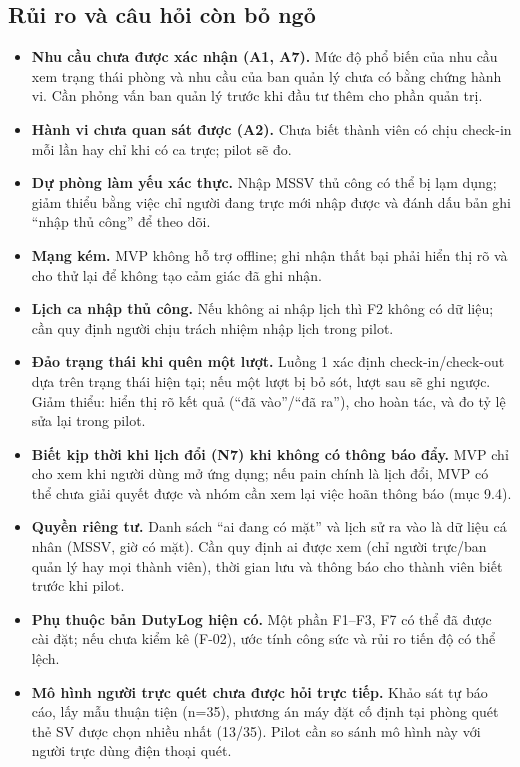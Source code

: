 \subsection{Rủi ro và câu hỏi còn bỏ ngỏ}
\begin{itemize}[nosep]
\item \textbf{Nhu cầu chưa được xác nhận (A1, A7).} Mức độ phổ biến của nhu cầu xem trạng thái phòng và nhu cầu của ban quản lý chưa có bằng chứng hành vi. Cần phỏng vấn ban quản lý trước khi đầu tư thêm cho phần quản trị.
\item \textbf{Hành vi chưa quan sát được (A2).} Chưa biết thành viên có chịu check-in mỗi lần hay chỉ khi có ca trực; pilot sẽ đo.
\item \textbf{Dự phòng làm yếu xác thực.} Nhập MSSV thủ công có thể bị lạm dụng; giảm thiểu bằng việc chỉ người đang trực mới nhập được và đánh dấu bản ghi ``nhập thủ công'' để theo dõi.
\item \textbf{Mạng kém.} MVP không hỗ trợ offline; ghi nhận thất bại phải hiển thị rõ và cho thử lại để không tạo cảm giác đã ghi nhận.
\item \textbf{Lịch ca nhập thủ công.} Nếu không ai nhập lịch thì F2 không có dữ liệu; cần quy định người chịu trách nhiệm nhập lịch trong pilot.
\item \textbf{Đảo trạng thái khi quên một lượt.} Luồng 1 xác định check-in/check-out dựa trên trạng thái hiện tại; nếu một lượt bị bỏ sót, lượt sau sẽ ghi ngược. Giảm thiểu: hiển thị rõ kết quả (``đã vào''/``đã ra''), cho hoàn tác, và đo tỷ lệ sửa lại trong pilot.
\item \textbf{Biết kịp thời khi lịch đổi (N7) khi không có thông báo đẩy.} MVP chỉ cho xem khi người dùng mở ứng dụng; nếu pain chính là lịch đổi, MVP có thể chưa giải quyết được và nhóm cần xem lại việc hoãn thông báo (mục 9.4).
\item \textbf{Quyền riêng tư.} Danh sách ``ai đang có mặt'' và lịch sử ra vào là dữ liệu cá nhân (MSSV, giờ có mặt). Cần quy định ai được xem (chỉ người trực/ban quản lý hay mọi thành viên), thời gian lưu và thông báo cho thành viên biết trước khi pilot.
\item \textbf{Phụ thuộc bản DutyLog hiện có.} Một phần F1--F3, F7 có thể đã được cài đặt; nếu chưa kiểm kê (F-02), ước tính công sức và rủi ro tiến độ có thể lệch.
\item \textbf{Mô hình người trực quét chưa được hỏi trực tiếp.} Khảo sát tự báo cáo, lấy mẫu thuận tiện (n=35), phương án máy đặt cố định tại phòng quét thẻ SV được chọn nhiều nhất (13/35). Pilot cần so sánh mô hình này với người trực dùng điện thoại quét.
\end{itemize}